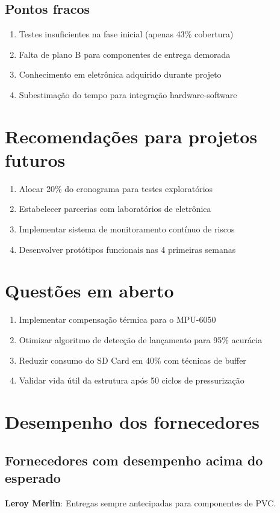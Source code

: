 \subsection{Pontos fracos}
\begin{enumerate}
	\item Testes insuficientes na fase inicial (apenas 43\% cobertura)
	\item Falta de plano B para componentes de entrega demorada
	\item Conhecimento em eletrônica adquirido durante projeto
	\item Subestimação do tempo para integração hardware-software
\end{enumerate}

\section{Recomendações para projetos futuros}
\begin{enumerate}
	\item Alocar 20\% do cronograma para testes exploratórios
	\item Estabelecer parcerias com laboratórios de eletrônica
	\item Implementar sistema de monitoramento contínuo de riscos
	\item Desenvolver protótipos funcionais nas 4 primeiras semanas
\end{enumerate}

\section{Questões em aberto}
\begin{enumerate}
	\item Implementar compensação térmica para o MPU-6050
	\item Otimizar algoritmo de detecção de lançamento para 95\% acurácia
	\item Reduzir consumo do SD Card em 40\% com técnicas de buffer
	\item Validar vida útil da estrutura após 50 ciclos de pressurização
\end{enumerate}

\section{Desempenho dos fornecedores}
\subsection{Fornecedores com desempenho acima do esperado}
\textbf{Leroy Merlin}: Entregas sempre antecipadas para componentes de PVC.

